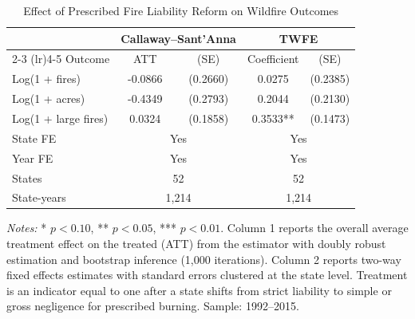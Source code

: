 \begin{table}[H]
\centering
\caption{Effect of Prescribed Fire Liability Reform on Wildfire Outcomes}
\label{tab:main}
\begin{threeparttable}
\begin{tabular}{l cc cc}
\toprule
& \multicolumn{2}{c}{Callaway--Sant'Anna} & \multicolumn{2}{c}{TWFE} \\
\cmidrule(lr){2-3} \cmidrule(lr){4-5}
Outcome & ATT & (SE) & Coefficient & (SE) \\
\midrule
Log(1 + fires) & -0.0866 & (0.2660) & 0.0275 & (0.2385) \\
Log(1 + acres) & -0.4349 & (0.2793) & 0.2044 & (0.2130) \\
Log(1 + large fires) & 0.0324 & (0.1858) & 0.3533** & (0.1473) \\
\midrule
State FE & \multicolumn{2}{c}{Yes} & \multicolumn{2}{c}{Yes} \\
Year FE & \multicolumn{2}{c}{Yes} & \multicolumn{2}{c}{Yes} \\
States & \multicolumn{2}{c}{52} & \multicolumn{2}{c}{52} \\
State-years & \multicolumn{2}{c}{1,214} & \multicolumn{2}{c}{1,214} \\
\bottomrule
\end{tabular}
\begin{tablenotes}[flushleft]
\small
\item \textit{Notes:} * $p<0.10$, ** $p<0.05$, *** $p<0.01$. Column 1 reports the overall average treatment effect on the treated (ATT) from the \citet{CallawayS2021} estimator with doubly robust estimation and bootstrap inference (1,000 iterations). Column 2 reports two-way fixed effects estimates with standard errors clustered at the state level. Treatment is an indicator equal to one after a state shifts from strict liability to simple or gross negligence for prescribed burning. Sample: 1992--2015.
\end{tablenotes}
\end{threeparttable}
\end{table}
